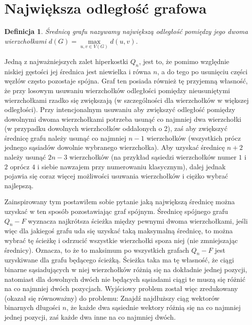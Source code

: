 \documentclass{pracamgr}
\newtheorem{defi}{Definicja}[section] %
\begin{document}
  \section{Największa odległość grafowa}%
   \begin{defi}\label{srednica grafu}
    \emph{Średnicą grafu} nazywamy największą odległość pomiędzy jego dwoma wierzchołkami $d(G)=\max\limits_{u,v\in V(G)}d(u,v)$.
   \end{defi}
   Jedną z najważniejszych zalet hiperkostki $Q_n$, jest to, że pomimo względnie niskiej gęstości jej średnica jest niewielka i równa $n$,
   a do tego po usunięciu części węzłów często pozostaje spójna.
   Graf ten posiada również tę przyjemną własność, że przy losowym usuwaniu wierzchołków odległości pomiędzy nieusuniętymi wierzchołkami rzadko się zwiększają
   (w szczególności dla wierzchołków w większej odległości).
   Przy intencjonalnym usuwaniu aby zwiększyć odległość pomiędzy dowolnymi dwoma wierzchołkami potrzeba usunąć co najmniej dwa wierzchołki
   (w przypadku dowolnych wierzhcołków oddalonych o 2), zaś aby zwiększyć średnicę grafu należy usunąć co najmniej $n-1$ wierzchołków
   (wszystkich prócz jednego sąsiadów dowolnie wybranego wierzchołka).
   Aby uzyskać średnicę $n+2$ należy usunąć $2n-3$ wierzchołków
   (na przykład sąsiedzi wierzchołków numer $1$ i $2$ oprócz $4$ i siebie nawzajem przy numerowaniu klasycznym),
   dalej jednak pojawia się coraz więcej możliwości usuwania wierzchołków i ciężko wybrać najlepszą.
    
   Zainspirowany tym postawiłem sobie pytanie jaką największą średnicę można uzyskać w ten sposób pozostawiając graf spójnym.
   Średnicę spójnego grafu $Q_n-F$ wyznacza najkrótsza ścieżka między pewnymi dwoma wierzchołkami, jeśli więc dla jakiegoś grafu uda się uzyskać
   taką maksymalną średnicę, to można wybrać tę ścieżkę i odrzucić wszystkie wierzchołki spoza niej (nie zmniejszając średnicy).
   Oznacza, to że to maksimum po wszystkich grafach $Q_n-F$ jest uzyskiwane dla grafu będącego ścieżką.
   Ścieżka taka ma tę własność, że ciągi binarne sąsiadujących w niej wierzchołków różnią się na dokładnie jednej pozycji,
   natomiast dla dowolnych dwóch nie będących sąsiadami ciągi te muszą się różnić na co najmniej dwóch pozycjach.
   Wyjściowy problem został więc zredukowany (okazał się równoważny) do problemu:\newline
   Znajdź najdłuższy ciąg wektorów binarnych długości $n$,
   że każde dwa sąsiednie wektory różnią się na co najmniej jednej pozycji, zaś każde dwa inne na co najmniej dwóch.
\end{document}
